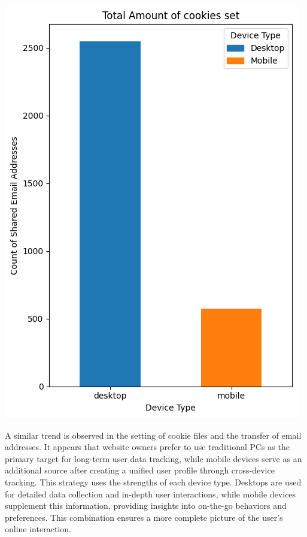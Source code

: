 \begin{minipage}{0.45\textwidth} 
    \includegraphics[width=\linewidth]{./assets/comparison6.png} 
\end{minipage}
\vspace{0.8cm}

A similar trend is observed in the setting of cookie files and the transfer of email addresses. It appears that website owners prefer to use traditional PCs as the primary target for long-term user data tracking, while mobile devices serve as an additional source after creating a unified user profile through cross-device tracking. This strategy uses the strengths of each device type. Desktops are used for detailed data collection and in-depth user interactions, while mobile devices supplement this information, providing insights into on-the-go behaviors and preferences. This combination ensures a more complete picture of the user's online interaction.